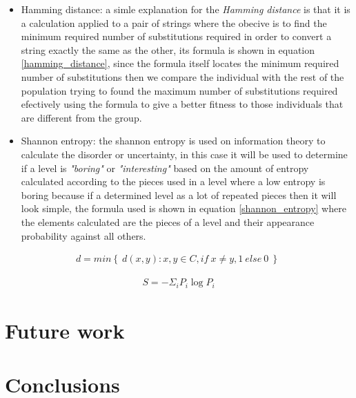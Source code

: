 \documentclass[conference]{IEEEtran}
\begin{document}
\begin{itemize}
    \item Hamming distance: a simle explanation for the \textit{Hamming distance} is that it is a calculation applied to a pair of strings where the obecive is to find the minimum required number of substitutions required in order to convert a string exactly the same as the other, its formula is shown in equation \ref{hamming_distance}, since the formula itself locates the minimum required number of substitutions then we compare the individual with the rest of the population trying to found the maximum number of substitutions required efectively using the formula to give a better fitness to those individuals that are different from the group.
    \item Shannon entropy: the shannon entropy is used on information theory to calculate the disorder or uncertainty, in this case it will be used to determine if a level is \textit{"boring"} or \textit{"interesting"} based on the amount of entropy calculated according to the pieces used in a level where a low entropy is boring because if a determined level as a lot of repeated pieces then it will look simple, the formula used is shown in equation \ref{shannon_entropy} where the elements calculated are the pieces of a level and their appearance probability against all others.
\end{itemize}

\begin{equation}
    \begin{aligned}
    d = min \left\{ \ d(x,y): x,y \in C, if \: x \neq y, 1 \: else \: 0 \: \right\} \
    \end{aligned}
    \label{hamming_distance}
\end{equation}

\begin{equation}
    \begin{aligned}
    S = - \Sigma_i P_i \log P_i
    \end{aligned}
    \label{shannon_entropy}
\end{equation}

\section{Future work}


\section{Conclusions}
\end{document}
